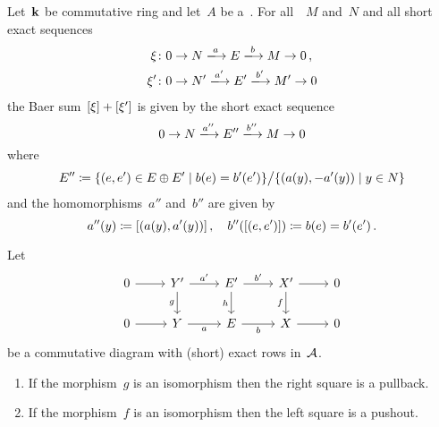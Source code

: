 \begin{remark}
  Let~$\mathbf{k}$ be commutative ring and let~$A$ be a~{\kalg}.
  For all~{}~$M$ and~$N$ and all short exact sequences
  \begin{align*}
    \xi
    &\colon
    0
    \to
    N
    \xlongto{a}
    E
    \xlongto{b}
    M
    \to
    0 \,,
    \\
    \xi'
    &\colon
    0
    \to
    N'
    \xlongto{a'}
    E'
    \xlongto{b'}
    M'
    \to
    0
  \end{align*}
  the Baer sum~$[\xi] + [\xi']$ is given by the short exact sequence
  \[
    0
    \to
    N
    \xlongto{a''}
    E''
    \xlongto{b''}
    M
    \to
    0
  \]
  where
  \[
    E''
    \defined
    \{
      (e,e') \in E \oplus E'
    \suchthat
      b(e) = b'(e')
    \}
    \big/
    \{
      (a(y), -a'(y))
    \suchthat
      y \in N
    \}
  \]
  and the homomorphisms~$a''$ and~$b''$ are given by
  \[
    a''(y)
    \coloneqq
    [ (a(y), a'(y)) ] \,,
    \quad
    b''([(e,e')])
    \coloneqq
    b(e)
    = b'(e')  \,.
  \]
\end{remark}


\begin{lemma}
  \label{converse for pullback and pushout}
  Let
  \[
    \begin{tikzcd}
        0
        \arrow{r}
      & Y'
        \arrow{r}[above]{a'}
        \arrow{d}[left]{g}
      & E'
        \arrow{r}[above]{b'}
        \arrow{d}[left]{h}
      & X'
        \arrow{r}
        \arrow{d}[left]{f}
      & 0
      \\
        0
        \arrow{r}
      & Y
        \arrow{r}[below]{a}
      & E
        \arrow{r}[below]{b}
      & X
        \arrow{r}
      & 0
    \end{tikzcd}
  \]
  be a commutative diagram with (short) exact rows in~$\mathcal{A}$.
  \begin{enumerate}
    \item
      \label{right is pullback}
      If the morphism~$g$ is an isomorphism then the right square is a pullback.
    \item
      \label{left is pushout}
      If the morphism~$f$ is an isomorphism then the left square is a pushout.
  \end{enumerate}
\end{lemma}


